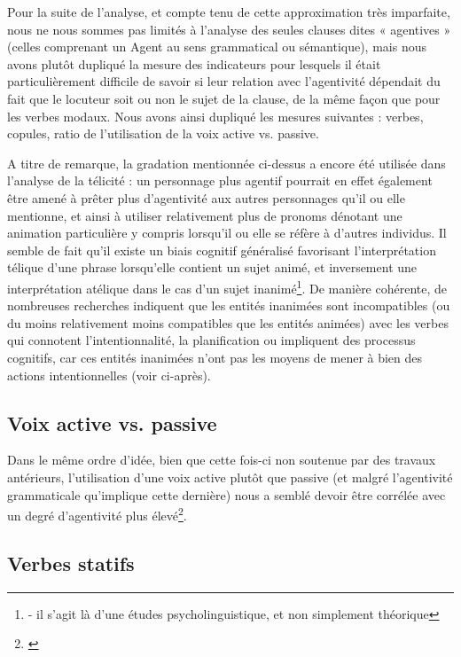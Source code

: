 Pour la suite de l'analyse, et compte tenu de cette approximation très imparfaite, nous ne nous sommes pas limités à l'analyse des seules clauses dites « agentives » (celles comprenant un Agent au sens grammatical ou sémantique), mais nous avons plutôt dupliqué la mesure des indicateurs pour lesquels il était particulièrement difficile de savoir si leur relation avec l'agentivité dépendait du fait que le locuteur soit ou non le sujet de la clause, de la même façon que pour les verbes modaux. Nous avons ainsi dupliqué les mesures suivantes : verbes, copules, ratio de l'utilisation de la voix active vs. passive.

A titre de remarque, la gradation mentionnée ci-dessus a encore été utilisée dans l'analyse de la télicité : un personnage plus agentif pourrait en effet également être amené à prêter plus d'agentivité aux autres personnages qu'il ou elle mentionne, et ainsi à utiliser relativement plus de pronoms dénotant une animation particulière y compris lorsqu'il ou elle se réfère à d'autres individus. Il semble de fait qu'il existe un biais cognitif généralisé favorisant l'interprétation télique d'une phrase lorsqu'elle contient un sujet animé, et inversement une interprétation atélique dans le cas d'un sujet inanimé\footnote{\cite{graf_interaction_2017} - il s'agit là d'une études psycholinguistique, et non simplement théorique}. De manière cohérente, de nombreuses recherches indiquent que les entités inanimées sont incompatibles (ou du moins relativement moins compatibles que les entités animées) avec les verbes qui connotent l'intentionnalité, la planification ou impliquent des processus cognitifs, car ces entités inanimées n'ont pas les moyens de mener à bien des actions intentionnelles (voir ci-après).

\subsection{Voix active vs. passive}

Dans le même ordre d'idée, bien que cette fois-ci non soutenue par des travaux antérieurs, l'utilisation d'une voix active plutôt que passive (et malgré l'agentivité grammaticale qu'implique cette dernière) nous a semblé devoir être corrélée avec un degré d'agentivité plus élevé\footnote{\cite{hopper_transitivity_1980}}.

\subsection{Verbes statifs}

